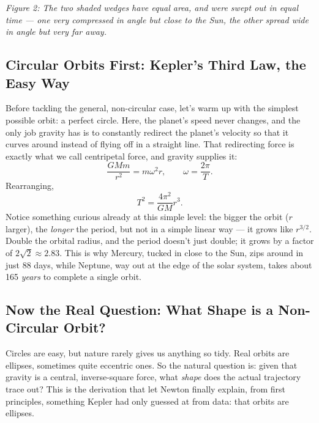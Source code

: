 \documentclass[11pt]{article}
\begin{document}
\begin{center}
\end{center}
\begin{center}\textit{Figure 2: The two shaded wedges have equal area, and were swept out in
equal time --- one very compressed in angle but close to the Sun, the other spread wide in angle
but very far away.}\end{center}

\subsection{Circular Orbits First: Kepler's Third Law, the Easy Way}

Before tackling the general, non-circular case, let's warm up with the simplest possible orbit: a
perfect circle. Here, the planet's speed never changes, and the only job gravity has is to
constantly redirect the planet's velocity so that it curves around instead of flying off in a
straight line. That redirecting force is exactly what we call centripetal force, and gravity
supplies it:
\[
\frac{GMm}{r^2} = m\omega^2 r, \qquad \omega=\frac{2\pi}{T}.
\]
Rearranging,
\[
\boxed{T^2 = \frac{4\pi^2}{GM}r^3.}
\]
Notice something curious already at this simple level: the bigger the orbit ($r$ larger), the
\emph{longer} the period, but not in a simple linear way --- it grows like $r^{3/2}$. Double the
orbital radius, and the period doesn't just double; it grows by a factor of $2\sqrt2\approx2.83$.
This is why Mercury, tucked in close to the Sun, zips around in just 88 days, while Neptune, way
out at the edge of the solar system, takes about 165 \emph{years} to complete a single orbit.

\subsection{Now the Real Question: What Shape is a Non-Circular Orbit?}

Circles are easy, but nature rarely gives us anything so tidy. Real orbits are ellipses, sometimes
quite eccentric ones. So the natural question is: given that gravity is a central, inverse-square
force, what \emph{shape} does the actual trajectory trace out? This is the derivation that let
Newton finally explain, from first principles, something Kepler had only guessed at from data:
that orbits are ellipses.
\end{document}
